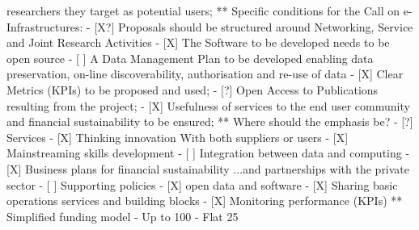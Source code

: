   researchers they target as potential users;
** Specific conditions for the Call on e-Infrastructures:
- [X?] Proposals should be structured around Networking, Service
  and Joint Research Activities
- [X] The Software to be developed needs to be open source
- [ ] A Data Management Plan to be developed enabling data preservation,
  on-line discoverability, authorisation and re-use of data
- [X] Clear Metrics (KPIs) to be proposed and used;
- [?] Open Access to Publications resulting from the project;
- [X] Usefulness of services to the end user community and
      financial sustainability to be ensured;
** Where should the emphasis be?
- [?] Services
- [X] Thinking innovation
      With both suppliers or users
- [X] Mainstreaming skills development
- [ ] Integration between data and computing
- [X] Business plans for financial sustainability
  ...and partnerships with the private sector
- [ ] Supporting policies
- [X] open data and software
- [X] Sharing basic operations services and building blocks
- [X] Monitoring performance (KPIs)
** Simplified funding model
   - Up to 100%
     - Flat 25%
